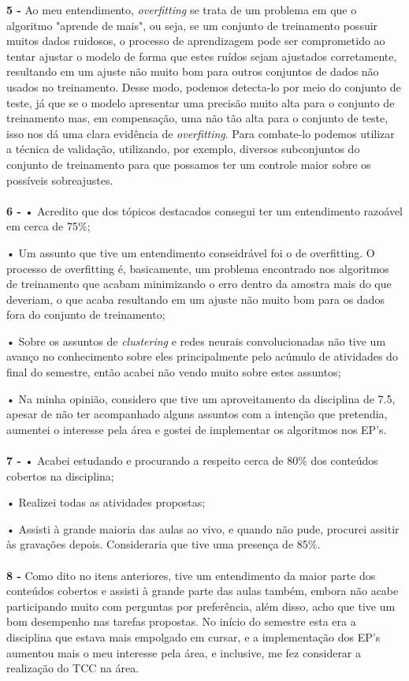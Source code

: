\documentclass[10pt,a4paper]{article}
\begin{document}
\textbf{5 - } Ao meu entendimento, \textit{overfitting} se trata de um problema em que o algoritmo "aprende de mais", ou seja, se um conjunto de treinamento possuir muitos dados ruidosos, o processo de aprendizagem pode ser comprometido ao tentar ajustar o modelo de forma que estes ruídos sejam ajustados corretamente, resultando em um ajuste não muito bom para outros conjuntos de dados não usados no treinamento. Desse modo, podemos detecta-lo por meio do conjunto de teste, já que se o modelo apresentar uma precisão muito alta para o conjunto de treinamento mas, em compensação, uma não tão alta para o conjunto de teste, isso nos dá uma clara evidência de \textit{overfitting}. Para combate-lo podemos utilizar a técnica de validação, utilizando, por exemplo, diversos subconjuntos do conjunto de treinamento para que possamos ter um controle maior sobre os possíveis sobreajustes. \\ \\

\textbf{6 - }
• Acredito que dos tópicos destacados consegui ter um entendimento razoável em cerca de 75\%;

• Um assunto que tive um entendimento conseidrável foi o de overfitting. O processo de overfitting é, basicamente, um problema encontrado nos algoritmos de treinamento que acabam minimizando o erro dentro da amostra mais do que deveriam, o que acaba resultando em um ajuste não muito bom para os dados fora do conjunto de treinamento;

• Sobre os assuntos de \textit{clustering} e redes neurais convolucionadas não tive um avanço no conhecimento sobre eles principalmente pelo acúmulo de atividades do final do semestre, então acabei não vendo muito sobre estes assuntos;

• Na minha opinião, considero que tive um aproveitamento da disciplina de 7.5, apesar de não ter acompanhado alguns assuntos com a intenção que pretendia, aumentei o interesse pela área e gostei de implementar os algoritmos nos EP's. \\ \\

\textbf{7 - } • Acabei estudando e procurando a respeito cerca de 80\% dos conteúdos cobertos na disciplina;

• Realizei todas as atividades propostas;

• Assisti à grande maioria das aulas ao vivo, e quando não pude, procurei assitir às gravações depois. Consideraria que tive uma presença de 85\%. \\ \\

\textbf{8 - } Como dito no itens anteriores, tive um entendimento da maior parte dos conteúdos cobertos e assisti à grande parte das aulas também, embora não acabe participando muito com perguntas por preferência, além disso, acho que tive um bom desempenho nas tarefas propostas. No início do semestre esta era a disciplina que estava mais empolgado em cursar, e a implementação dos EP's aumentou mais o meu interesse pela área, e inclusive, me fez considerar a realização do TCC na área.
\end{document}
